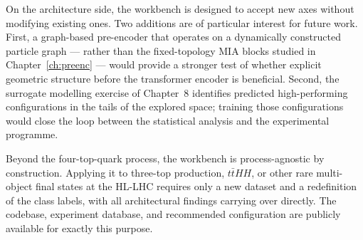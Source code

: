 On the architecture side, the workbench is designed to accept new axes without modifying
existing ones.
Two additions are of particular interest for future work.
First, a graph-based pre-encoder that operates on a dynamically constructed particle graph
--- rather than the fixed-topology MIA blocks studied in Chapter~\ref{ch:preenc} --- would
provide a stronger test of whether explicit geometric structure before the transformer encoder
is beneficial.
Second, the surrogate modelling exercise of Chapter~8 identifies predicted high-performing
configurations in the tails of the explored space; training those configurations would close
the loop between the statistical analysis and the experimental programme.

Beyond the four-top-quark process, the workbench is process-agnostic by construction.
Applying it to three-top production, $t\bar{t}HH$, or other rare multi-object final states at
the HL-LHC requires only a new dataset and a redefinition of the class labels, with all
architectural findings carrying over directly.
The codebase, experiment database, and recommended configuration are publicly available for
exactly this purpose.
